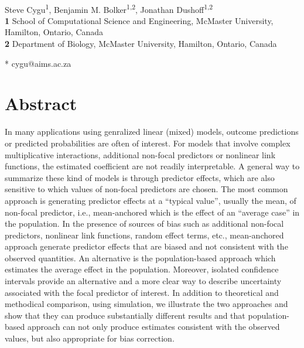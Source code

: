 \documentclass[10pt,letterpaper]{article}
\begin{document}
\vspace*{0.2in}

\begin{flushleft}
{\Large
\textbf{} %
}
\newline
\\
Steve Cygu\textsuperscript{1},
Benjamin M. Bolker\textsuperscript{1,2},
Jonathan Dushoff\textsuperscript{1,2}
\\
\bigskip
\textbf{1} School of Computational Science and Engineering, McMaster University, Hamilton, Ontario, Canada
\\
\textbf{2} Department of Biology, McMaster University, Hamilton, Ontario, Canada
\\
\bigskip


* cygu@aims.ac.za

\end{flushleft}
\section*{Abstract}

In many applications using genralized linear (mixed) models, outcome predictions or predicted probabilities are often of interest. For models that involve complex multiplicative interactions, additional non-focal predictors or nonlinear link functions, the estimated coefficient are not readily interpretable. A general way to summarize these kind of models is through predictor effects, which are also sensitive to which values of non-focal predictors are chosen. The most common approach is generating predictor effects at a ``typical value'', usually the mean, of non-focal predictor, i.e., mean-anchored which is the effect of an ``average case'' in the population. In the presence of sources of bias such as additional non-focal predictors, nonlinear link functions, random effect terms, etc., mean-anchored approach generate predictor effects that are biased and not consistent with the observed quantities. An alternative is the population-based approach which estimates the average effect in the population. Moreover, isolated confidence intervals provide an alternative and a more clear way to describe uncertainty associated with the focal predictor of interest. In addition to theoretical and methodical comparison, using simulation, we illustrate the two approaches and show that they can produce substantially different results and that population-based approach can not only produce estimates consistent with the observed values, but also appropriate for bias correction.
\end{document}
